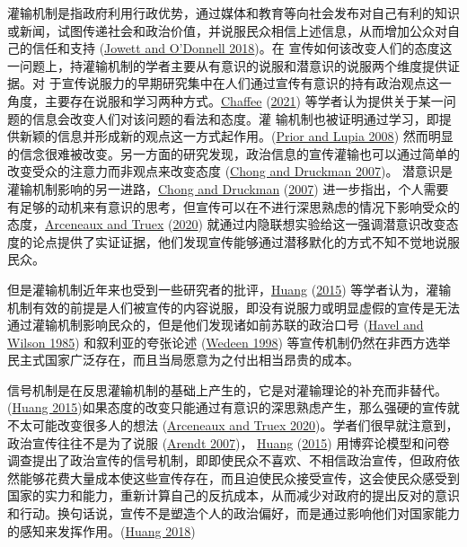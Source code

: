 \documentclass[
  12pt,
]{ctexart}
\begin{document}
灌输机制是指政府利用行政优势，通过媒体和教育等向社会发布对自己有利的知识或新闻，试图传递社会和政治价值，并说服民众相信上述信息，从而增加公众对自己的信任和支持 (\protect\hyperlink{ref-JowettODonnell2018}{Jowett and O'Donnell 2018})。在 宣传如何该改变人们的态度这一问题上，持灌输机制的学者主要从有意识的说服和潜意识的说服两个维度提供证据。对 于宣传说服力的早期研究集中在人们通过宣传有意识的持有政治观点这一角度，主要存在说服和学习两种方式。\protect\hyperlink{ref-Chaffee2021}{Chaffee} (\protect\hyperlink{ref-Chaffee2021}{2021}) 等学者认为提供关于某一问题的信息会改变人们对该问题的看法和态度。灌 输机制也被证明通过学习，即提供新颖的信息并形成新的观点这一方式起作用。(\protect\hyperlink{ref-PriorLupia2008}{Prior and Lupia 2008}) 然而明显的信念很难被改变。另一方面的研究发现，政治信息的宣传灌输也可以通过简单的改变受众的注意力而非观点来改变态度 (\protect\hyperlink{ref-ChongDruckman2007}{Chong and Druckman 2007})。
潜意识是灌输机制影响的另一进路，\protect\hyperlink{ref-ChongDruckman2007}{Chong and Druckman} (\protect\hyperlink{ref-ChongDruckman2007}{2007}) 进一步指出，个人需要有足够的动机来有意识的思考，但宣传可以在不进行深思熟虑的情况下影响受众的态度，\protect\hyperlink{ref-ArceneauxTruex2020}{Arceneaux and Truex} (\protect\hyperlink{ref-ArceneauxTruex2020}{2020}) 就通过内隐联想实验给这一强调潜意识改变态度的论点提供了实证证据，他们发现宣传能够通过潜移默化的方式不知不觉地说服民众。

但是灌输机制近年来也受到一些研究者的批评，\protect\hyperlink{ref-Huang2015a}{Huang} (\protect\hyperlink{ref-Huang2015a}{2015}) 等学者认为，灌输机制有效的前提是人们被宣传的内容说服，即没有说服力或明显虚假的宣传是无法通过灌输机制影响民众的，但是他们发现诸如前苏联的政治口号 (\protect\hyperlink{ref-HavelWilson1985}{Havel and Wilson 1985}) 和叙利亚的夸张论述 (\protect\hyperlink{ref-Wedeen1998}{Wedeen 1998}) 等宣传机制仍然在非西方选举民主式国家广泛存在，而且当局愿意为之付出相当昂贵的成本。

信号机制是在反思灌输机制的基础上产生的，它是对灌输理论的补充而非替代。(\protect\hyperlink{ref-Huang2015a}{Huang 2015})如果态度的改变只能通过有意识的深思熟虑产生，那么强硬的宣传就不太可能改变很多人的想法 (\protect\hyperlink{ref-ArceneauxTruex2020}{Arceneaux and Truex 2020})。学者们很早就注意到，政治宣传往往不是为了说服 (\protect\hyperlink{ref-Arendt2007}{Arendt 2007})， \protect\hyperlink{ref-Huang2015a}{Huang} (\protect\hyperlink{ref-Huang2015a}{2015}) 用博弈论模型和问卷调查提出了政治宣传的信号机制，即即使民众不喜欢、不相信政治宣传，但政府依然能够花费大量成本使这些宣传存在，而且迫使民众接受宣传，这会使民众感受到国家的实力和能力，重新计算自己的反抗成本，从而减少对政府的提出反对的意识和行动。换句话说，宣传不是塑造个人的政治偏好，而是通过影响他们对国家能力的感知来发挥作用。(\protect\hyperlink{ref-Huang2018}{Huang 2018})
\end{document}
